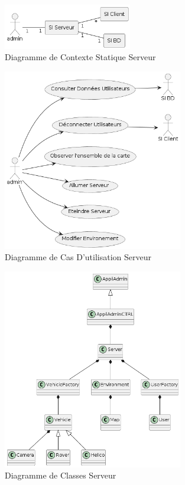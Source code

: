 \documentclass[12pt,a4paper]{scrartcl}
\begin{document}
\begin{figure}[h]
    \centering
    \includegraphics[width=0.5\textwidth]{DiagCS_Admin.png}
    \caption{Diagramme de Contexte Statique Serveur}\label{cs_serv}
\end{figure}

\begin{figure}[h]
    \centering
    \includegraphics[width=0.7\textwidth]{Diag_UC_Admin.png}
    \caption{Diagramme de Cas D'utilisation Serveur}\label{uc_serv}
\end{figure}

\begin{figure}[h]
    \centering
    \includegraphics[width=0.7\textwidth]{Diag_Class_Admin.png}
    \caption{Diagramme de Classes Serveur}\label{seq_serv}
\end{figure}
\end{document}
